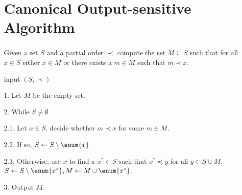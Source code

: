 \section{Canonical Output-sensitive Algorithm}
\begin{frame}\frametitle{\insertsection}\justifying
\begin{probl}
Given a set \(S\) and a partial order \(\prec\) compute the set \(M \subseteq S\)
such that for all \(x \in S\) either \(x \in M\) or there exists a \(m \in M\)
such that \(m \prec x\).
\end{probl}
\begin{algo}
\item[input] \((S, \prec)\)
\item[1.] Let \(M\) be the empty set.
\item[2.] While \(S \neq \emptyset\)
\item[2.1.] Let \(x \in S\), decide whether \(m \prec x\) for some \(m \in M\).
\item[2.2.] If so, \(S \gets S \setminus \enum{x}\).
\item[2.3.] Otherwise, use \(x\) to find a \(x^* \in S\) such that \(x^*
	\preceq y\) for all \(y \in S \cup M\). \(S \gets S \setminus \enum{x^*}, M
	\gets M \cup \enum{x^*}\).
\item[3.] Output \(M\).
\end{algo}
\end{frame}
